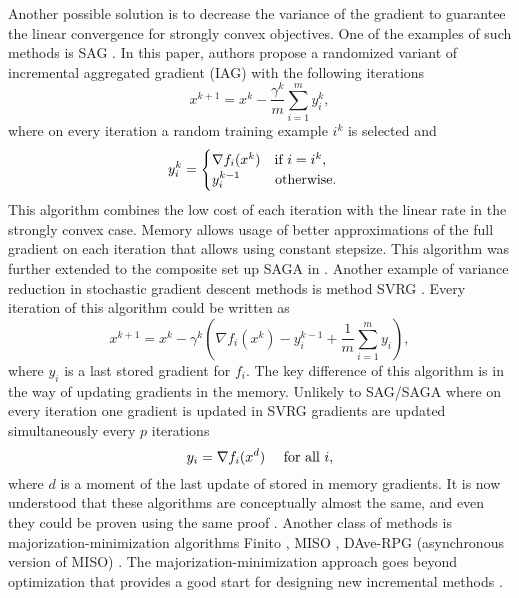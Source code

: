 Another possible solution is to decrease the variance of the gradient to guarantee the linear convergence for strongly convex objectives. One of the examples of such methods is SAG \cite{schmidt2017minimizing}. In this paper, authors propose a randomized variant of incremental aggregated gradient (IAG) \cite{blatt2007convergent} with the following iterations
$$
x^{k+1} = x^k - \frac{\gamma^k}{m}\sum_{i=1}^m y_i^k,
$$
where on every iteration a random training example $i^k$ is selected and 
$$
y_i^k = \begin{cases} \nabla f_i(x^k)~~~\textnormal{if }i = i^k,\\y_i^{k-1}~~~~~~~\,\textnormal{otherwise.}\end{cases}
$$
This algorithm combines the low cost of each iteration with the linear rate in the strongly convex case.
Memory allows usage of better approximations of the full gradient on each iteration that allows using constant stepsize. This algorithm was further extended to the composite set up SAGA in \cite{defazio2014saga}. Another example of variance reduction in stochastic gradient descent methods is method SVRG \cite{johnson2013accelerating}. Every iteration of this algorithm could be written as
$$
x^{k+1} = x^k -\gamma^k\left(\nabla f_i(x^k) - y_i^{k-1} + \frac{1}{m}\sum_{i=1}^m y_i\right),
$$
where $y_i$ is a last stored gradient for $f_i$. The key difference of this algorithm is in the way of updating gradients in the memory. Unlikely to SAG/SAGA where on every iteration one gradient is updated in SVRG gradients are updated simultaneously every $p$ iterations
$$
y_i = \nabla f_i(x^d)~~~~\textnormal{for all }i,
$$
where $d$ is a moment of the last update of stored in memory gradients. It is now understood that these algorithms are conceptually almost the same, and even they could be proven using the same proof \cite{kovalev2019don, hofmann2015variance}. Another class of methods is majorization-minimization algorithms Finito \cite{defazio2014finito}, MISO \cite{mairal2015incremental}, DAve-RPG (asynchronous version of MISO) \cite{mishchenko2018}. The majorization-minimization approach goes beyond optimization that provides a good start for designing new incremental methods \cite{qian2019miso}.